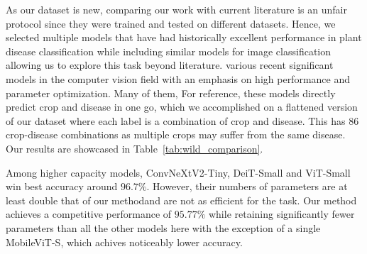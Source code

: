 \documentclass[runningheads]{llncs}
\begin{document}
As our dataset is new, comparing our work with current literature is an unfair protocol since they were trained and tested on different datasets. Hence, we selected multiple models that have had historically excellent performance in plant disease classification \cite{shafay2025recent, pal2025lightweight} while including similar models for image classification allowing us to explore this task beyond literature. various recent significant models in the computer vision field with an emphasis on high performance and parameter optimization. Many of them, For reference, these models directly predict crop and disease in one go, which we accomplished on a flattened version of our dataset where each label is a combination of crop and disease. This has 86 crop-disease combinations as multiple crops may suffer from the same disease. Our results are showcased in Table~\ref{tab:wild_comparison}.

Among higher capacity models, ConvNeXtV2-Tiny, DeiT-Small and ViT-Small win best accuracy around $96.7\%$. However, their numbers of parameters are at least double that of our methodand are not as efficient for the task. Our method achieves a competitive performance of $95.77\%$ while retaining significantly fewer parameters than all the other models here with the exception of a single MobileViT-S, which achives noticeably lower accuracy.


\end{document}
